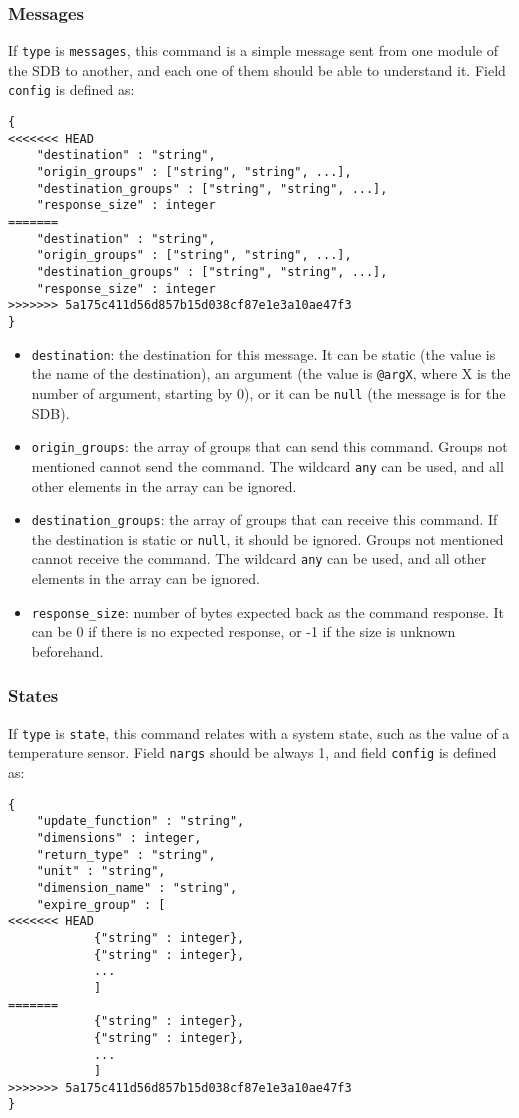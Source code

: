 \documentclass[12pt,a4paper]{report}
\begin{document}
\subsubsection*{Messages}
If \texttt{type} is \texttt{messages}, this command is a simple message sent from one module of the SDB to another, and each one of them should be able to understand it. Field \texttt{config} is defined as:
\begin{lstlisting}
{
<<<<<<< HEAD
    "destination" : "string",
    "origin_groups" : ["string", "string", ...],
    "destination_groups" : ["string", "string", ...],
    "response_size" : integer
=======
	"destination" : "string",
	"origin_groups" : ["string", "string", ...],
	"destination_groups" : ["string", "string", ...],
	"response_size" : integer
>>>>>>> 5a175c411d56d857b15d038cf87e1e3a10ae47f3
}
\end{lstlisting}

\begin{itemize}
\item \texttt{destination}: the destination for this message. It can be static (the value is the name of the destination), an argument (the value is \texttt{@argX}, where X is the number of argument, starting by 0), or it can be \texttt{null} (the message is for the SDB).
\item \texttt{origin\_groups}: the array of groups that can send this command. Groups not mentioned cannot send the command. The wildcard \texttt{any} can be used, and all other elements in the array can be ignored.
\item \texttt{destination\_groups}: the array of groups that can receive this command. If the destination is static or \texttt{null}, it should be ignored. Groups not mentioned cannot receive the command. The wildcard \texttt{any} can be used, and all other elements in the array can be ignored.
\item \texttt{response\_size}: number of bytes expected back as the command response. It can be 0 if there is no expected response, or -1 if the size is unknown beforehand.
\end{itemize}

\subsubsection*{States}
If \texttt{type} is \texttt{state}, this command relates with a system state, such as the value of a temperature sensor. Field \texttt{nargs} should be always 1, and field \texttt{config} is defined as:
\begin{lstlisting}
{
    "update_function" : "string",
    "dimensions" : integer,
    "return_type" : "string",
    "unit" : "string",
    "dimension_name" : "string",
    "expire_group" : [
<<<<<<< HEAD
            {"string" : integer},
            {"string" : integer},
            ...
            ]
=======
    		{"string" : integer},
    		{"string" : integer},
    		...
    		]
>>>>>>> 5a175c411d56d857b15d038cf87e1e3a10ae47f3
}
\end{lstlisting}
\end{document}
